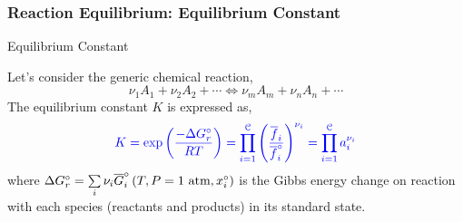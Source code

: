 \documentclass[10pt,compress,unknownkeysallowed]{beamer}
\begin{document}
\begin{frame}
  \frametitle{Reaction Equilibrium: Equilibrium Constant}
      \begin{block}{\begin{center}Equilibrium Constant\end{center}}
            Let's consider the generic chemical reaction,
               \begin{displaymath}
                   \nu_{1} A_{1} + \nu_{2} A_{2}  + \cdots  \Longleftrightarrow \nu_{m} A_{m} + \nu_{n} A_{n} + \cdots  
               \end{displaymath} 
            The equilibrium constant $K$ is expressed as,
               \begin{displaymath}
                  \blue{K = \exp\left(\frc{-\Delta G_{r}^{\circ}}{RT}\right) = \prod\limits_{i=1}^{\mathcal{C}}\left(\frc{\overline{f}_{i}}{\overline{f}_{i}^{\circ}}\right)^{\nu_{i}} = \prod\limits_{i=1}^{\mathcal{C}} a_{i}^{\nu_{i}}}
               \end{displaymath}
               where $\Delta G_{r}^{\circ}=\summation[\nu_{i}\overline{G}_{i}^{\circ}\left(T,P=1\text{ atm}, x_{i}^{\circ}\right)]{i}{}$ is the Gibbs energy change on reaction with each species (reactants and products) in its standard state.
      \end{block}

\end{frame}
\end{document}
